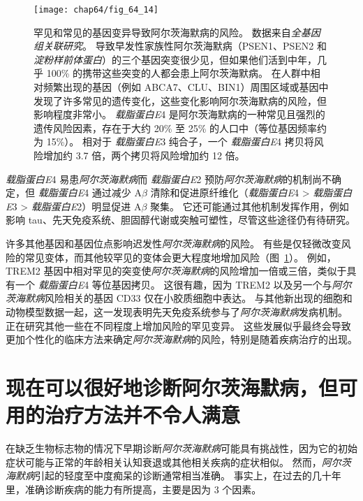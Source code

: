 \begin{figure}[htbp]
	\centering
	\texttt{[image: chap64/fig\_64\_14]}
	\caption{罕见和常见的基因变异导致阿尔茨海默病的风险。
		数据来自\textit{全基因组关联研究}。
		导致早发性家族性阿尔茨海默病（PSEN1、PSEN2 和 \textit{淀粉样前体蛋白}）的三个基因突变很少见，但如果他们活到中年，几乎 100\% 的携带这些突变的人都会患上阿尔茨海默病。
		在人群中相对频繁出现的基因（例如 ABCA7、CLU、BIN1）周围区域或基因中发现了许多常见的遗传变化，这些变化影响阿尔茨海默病的风险，但影响程度非常小。
		\textit{载脂蛋白E}4 是阿尔茨海默病的一种常见且强烈的遗传风险因素，存在于大约 20\% 至 25\% 的人口中（等位基因频率约为 15\%）。
		相对于 \textit{载脂蛋白E}3 纯合子，一个 \textit{载脂蛋白E}4 拷贝将风险增加约 3.7 倍，两个拷贝将风险增加约 12 倍\cite{karch2015alzheimer}。}
	\label{fig:64_14}
\end{figure}


\textit{载脂蛋白E}4 易患\textit{阿尔茨海默病}而 \textit{载脂蛋白E}2 预防\textit{阿尔茨海默病}的机制尚不确定，但 \textit{载脂蛋白E}4 通过减少 A$\beta$ 清除和促进原纤维化（\textit{载脂蛋白E}4 > \textit{载脂蛋白E}3 > \textit{载脂蛋白E}2）明显促进 A$\beta$ 聚集。
它还可能通过其他机制发挥作用，例如影响 tau、先天免疫系统、胆固醇代谢或突触可塑性，尽管这些途径仍有待研究。


许多其他基因和基因位点影响迟发性\textit{阿尔茨海默病}的风险。
有些是仅轻微改变风险的常见变体，而其他较罕见的变体会更大程度地增加风险（图~\ref{fig:64_14}）。
例如，TREM2 基因中相对罕见的突变使\textit{阿尔茨海默病}的风险增加一倍或三倍，类似于具有一个 \textit{载脂蛋白E}4 等位基因拷贝。
这很有趣，因为 TREM2 以及另一个与\textit{阿尔茨海默病}风险相关的基因 CD33 仅在小胶质细胞中表达。
与其他新出现的细胞和动物模型数据一起，这一发现表明先天免疫系统参与了\textit{阿尔茨海默病}发病机制。
正在研究其他一些在不同程度上增加风险的罕见变异。
这些发展似乎最终会导致更加个性化的临床方法来确定\textit{阿尔茨海默病}的风险，特别是随着疾病治疗的出现。



\section{现在可以很好地诊断阿尔茨海默病，但可用的治疗方法并不令人满意}

在缺乏生物标志物的情况下早期诊断\textit{阿尔茨海默病}可能具有挑战性，因为它的初始症状可能与正常的年龄相关认知衰退或其他相关疾病的症状相似。
然而，\textit{阿尔茨海默病}引起的轻度至中度痴呆的诊断通常相当准确。
事实上，在过去的几十年里，准确诊断疾病的能力有所提高，主要是因为 3 个因素。

